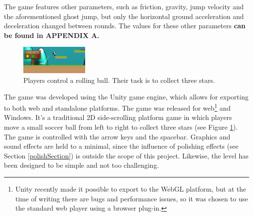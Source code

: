 The game features other parameters, such as friction, gravity, jump velocity and the aforementioned ghost jump, but only the horizontal ground acceleration and deceleration changed between rounds. The values for these other parameters \textbf{can be found in APPENDIX A.}

\begin{figure}[htbp]
\centering
\includegraphics[width=0.3\textwidth]{Pics/gf}
\caption{Players control a rolling ball. Their task is to collect three stars.}
\label{fig:game}
\end{figure}

The game was developed using the Unity game engine, which allows for exporting to both web and standalone platforms. The game was released for web\footnote{Unity recently made it possible to export to the WebGL platform, but at the time of writing there are bugs and performance issues, so it was chosen to use the standard web player using a browser plug-in.} and Windows. It's a traditional 2D side-scrolling platform game in which players move a small soccer ball from left to right to collect three stars (see Figure \ref{fig:game}). The game is controlled with the arrow keys and the spacebar. Graphics and sound effects are held to a minimal, since the influence of polishing effects (see Section \ref{polishSection}) is outside the scope of this project. Likewise, the level has been designed to be simple and not too challenging.
